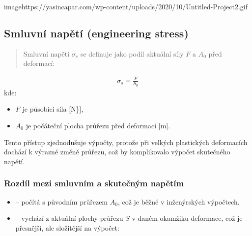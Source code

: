 \documentclass[letterpaper,10pt,english]{jupyterBook}
\begin{document}
{{\begin{sphinxuseclass}{{image}https://yasincapar.com/wp-content/uploads/2020/10/Untitled-Project2.gif}
\end{sphinxuseclass}

\subsection{Smluvní napětí (engineering stress)}
\label{\detokenize{Prednasky/2_6_In_u017een_xfdrsk_xe9_a_skute_u010dn_xe9_nap_u011bt_xed:smluvni-napeti-engineering-stress}}\begin{quote}

\sphinxAtStartPar
Smluvní napětí \(\sigma_s\) se definuje jako podíl aktuální síly \(F\) a  \(A_0\) před deformací:
\end{quote}
\begin{equation*}
\begin{split}
\sigma_s = \frac{F}{S_0}
\end{split}
\end{equation*}
\sphinxAtStartPar
kde:
\begin{itemize}
\item {} 
\sphinxAtStartPar
\(F\) je působící síla {[}N\}{]},

\item {} 
\sphinxAtStartPar
\(A_0\) je počáteční plocha průřezu před deformací {[}m{]}.

\end{itemize}

\sphinxAtStartPar
Tento přístup zjednodušuje výpočty, protože při velkých plastických deformacích dochází k výrazné změně průřezu, což by komplikovalo výpočet skutečného napětí.


\subsubsection{Rozdíl mezi smluvním a skutečným napětím}
\label{\detokenize{Prednasky/2_6_In_u017een_xfdrsk_xe9_a_skute_u010dn_xe9_nap_u011bt_xed:rozdil-mezi-smluvnim-a-skutecnym-napetim}}\begin{itemize}
\item {} 
\sphinxAtStartPar
{} – počítá s původním průřezem \(A_0\), což je běžné v inženýrských výpočtech.

\item {} 
\sphinxAtStartPar
{} – vychází z aktuální plochy průřezu \(S\) v daném okamžiku deformace, což je přesnější, ale složitější na výpočet:


\end{itemize}}}
\end{document}
